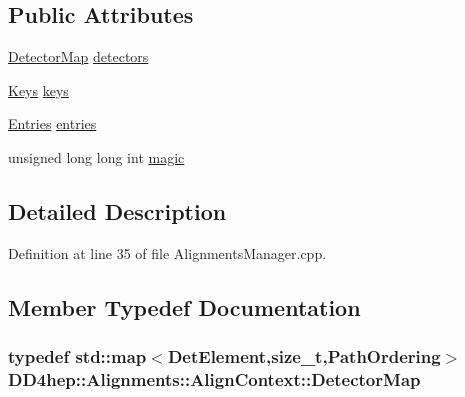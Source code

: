 \subsection*{Public Attributes}
\begin{DoxyCompactItemize}
\item 
\hyperlink{class_d_d4hep_1_1_alignments_1_1_align_context_a87b50a8f7563aefb2944aebe2d5bb33e}{DetectorMap} \hyperlink{class_d_d4hep_1_1_alignments_1_1_align_context_a752624c02c61692d9e56cfccd43adaa7}{detectors}
\item 
\hyperlink{class_d_d4hep_1_1_alignments_1_1_align_context_afed2b1b68f90bb0129bd51a08904332b}{Keys} \hyperlink{class_d_d4hep_1_1_alignments_1_1_align_context_ab4f2ddd57d4f86566bb37d5c6779b6d2}{keys}
\item 
\hyperlink{class_d_d4hep_1_1_alignments_1_1_align_context_a1b5a088a6d88177089055193c11aa67c}{Entries} \hyperlink{class_d_d4hep_1_1_alignments_1_1_align_context_a7ac8a0b3a176098807efafdc3a429cd5}{entries}
\item 
unsigned long long int \hyperlink{class_d_d4hep_1_1_alignments_1_1_align_context_ab1fa723ae13a70098621bf9f91decf62}{magic}
\end{DoxyCompactItemize}


\subsection{Detailed Description}


Definition at line 35 of file AlignmentsManager.cpp.

\subsection{Member Typedef Documentation}
\hypertarget{class_d_d4hep_1_1_alignments_1_1_align_context_a87b50a8f7563aefb2944aebe2d5bb33e}{
\subsubsection[{DetectorMap}]{\setlength{\rightskip}{0pt plus 5cm}typedef std::map$<${\bf DetElement},size\_\-t,{\bf PathOrdering}$>$ {\bf DD4hep::Alignments::AlignContext::DetectorMap}}}
\label{class_d_d4hep_1_1_alignments_1_1_align_context_a87b50a8f7563aefb2944aebe2d5bb33e}


